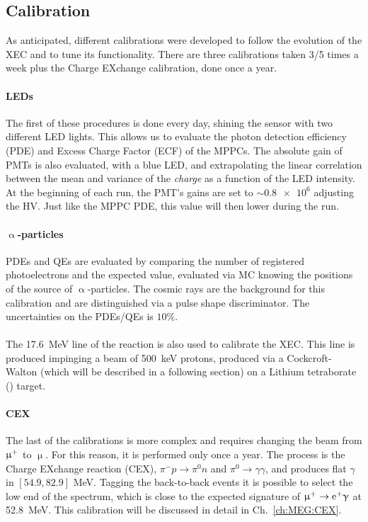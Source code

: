 \begin{refsection}
    \subsection{Calibration}    
    \label{sec:MEG:XEC:calibrations}
    As anticipated, different calibrations were developed to follow the evolution of the XEC and to tune its functionality. 
    There are three calibrations taken 3/5 times a week plus the Charge EXchange calibration, done once a year.
    
    \paragraph{LEDs} The first of these procedures is done every day, shining the sensor with two different LED lights. 
    This allows us to evaluate the photon detection efficiency (PDE) and Excess Charge Factor (ECF) of the MPPCs.
    The absolute gain of PMTs is also evaluated, with a blue LED, and extrapolating the linear correlation between the mean and variance of the \textit{charge} as a function of the LED intensity. 
    At the beginning of each run, the PMT's gains are set to $\sim\num{0.8e6}$ adjusting the HV. 
    Just like the MPPC PDE, this value will then lower during the run.

    \paragraph{$\upalpha$-particles} PDEs and QEs are evaluated by comparing the number of registered photoelectrons and the expected value, evaluated via MC knowing the positions of the  source of $\upalpha$-particles.
    The cosmic rays are the background for this calibration and are distinguished via a pulse shape discriminator.
    The uncertainties on the PDEs/QEs is $10\%$.

    \paragraph{}
    The \SI{17.6}{MeV} line of the  reaction is also used to calibrate the XEC.
    This line is produced impinging a beam of \SI{500}{keV} protons, produced via a Cockcroft-Walton (which will be described in a following section) on a Lithium tetraborate () target.

    \paragraph{CEX}
    The last of the calibrations is more complex and requires changing the beam from $\upmu^+$ to $\upmu$. 
    For this reason, it is performed only once a year.
    The process is the Charge EXchange reaction (CEX), $\pi^-p\rightarrow \pi^0n$ and $\pi^0\rightarrow\gamma\gamma$, and produces flat $\gamma$ in $[54.9,82.9]$ MeV.
    Tagging the back-to-back events it is possible to select the low end of the spectrum, which is close to the expected signature of $\upmu^+\rightarrow\text{e}^+\upgamma$ at \SI{52.8}{MeV}. This calibration will be discussed in detail in Ch.~\ref{ch:MEG:CEX}.


\end{refsection}
